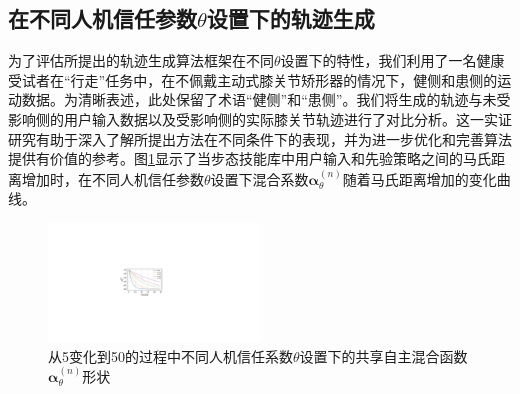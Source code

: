 \subsection{在不同人机信任参数$\theta $设置下的轨迹生成}
为了评估所提出的轨迹生成算法框架在不同$\theta $设置下的特性，我们利用了一名健康受试者在``行走''任务中，在不佩戴主动式膝关节矫形器的情况下，健侧和患侧的运动数据。为清晰表述，此处保留了术语``健侧''和``患侧''。我们将生成的轨迹与未受影响侧的用户输入数据以及受影响侧的实际膝关节轨迹进行了对比分析。这一实证研究有助于深入了解所提出方法在不同条件下的表现，并为进一步优化和完善算法提供有价值的参考。图\ref{fig:5-4}显示了当步态技能库中用户输入和先验策略之间的马氏距离增加时，在不同人机信任参数$\theta $设置下混合系数$\pmb{\alpha }_\theta ^{(n)}$随着马氏距离增加的变化曲线。
\begin{figure}[!t]
  \centering\includegraphics[width=0.5\textwidth]{figures/5-Fig-4.pdf}
  \caption{从5变化到50的过程中不同人机信任系数$\theta $设置下的共享自主混合函数$\pmb{\alpha }_\theta ^{(n)}$形状}
  \label{fig:5-4}
\end{figure}

